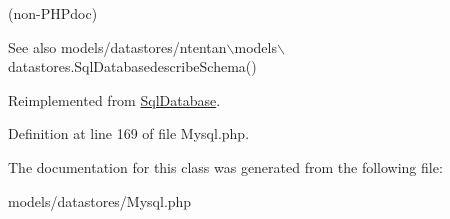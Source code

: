 (non-\/PHPdoc) 

\begin{DoxySeeAlso}{See also}
models/datastores/ntentan$\backslash$models$\backslash$datastores.SqlDatabasedescribeSchema() 
\end{DoxySeeAlso}


Reimplemented from \hyperlink{class_sql_database}{SqlDatabase}.



Definition at line 169 of file Mysql.php.



The documentation for this class was generated from the following file:\begin{DoxyCompactItemize}
\item 
models/datastores/Mysql.php\end{DoxyCompactItemize}
